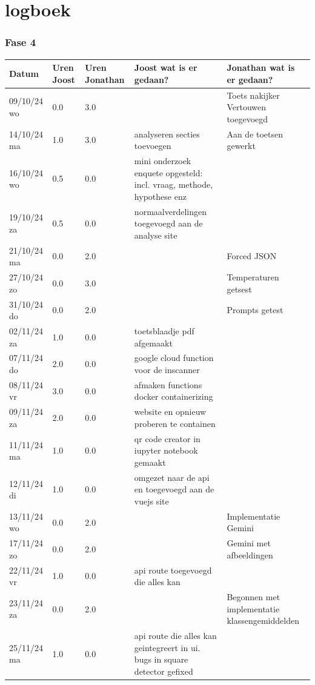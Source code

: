 \documentclass[12pt]{article}
\begin{document}
\pagebreak
\section{logboek}
\subsubsection*{Fase 4}
\footnotesize
\begin{longtable}{@{}p{2.5cm} p{1cm} p{1.5cm} p{5cm} p{5cm}}
Datum  & Uren Joost & Uren Jonathan & Joost wat is er gedaan? & Jonathan wat is er gedaan? \\
\midrule
\endhead
09/10/24 wo & 0.0 & 3.0 &  & Toets nakijker Vertouwen toegevoegd  \\
14/10/24 ma & 1.0 & 3.0 & analyseren secties toevoegen & Aan de toetsen gewerkt \\
16/10/24 wo & 0.5 & 0.0 & mini onderzoek enquete opgesteld: incl. vraag, methode, hypothese enz &  \\
19/10/24 za & 0.5 & 0.0 & normaalverdelingen toegevoegd aan de analyse site &  \\
21/10/24 ma & 0.0 & 2.0 &  & Forced JSON \\
27/10/24 zo & 0.0 & 3.0 &  & Temperaturen getsest \\
31/10/24 do & 0.0 & 2.0 &  & Prompts getest \\
02/11/24 za & 1.0 & 0.0 & toetsblaadje pdf afgemaakt &  \\
07/11/24 do & 2.0 & 0.0 & google cloud function voor de inscanner &  \\
08/11/24 vr & 3.0 & 0.0 & afmaken functions docker containerizing &  \\
09/11/24 za & 2.0 & 0.0 & website en opnieuw proberen te containen &  \\
11/11/24 ma & 1.0 & 0.0 & qr code creator in iupyter notebook gemaakt &  \\
12/11/24 di & 1.0 & 0.0 & omgezet naar de api en toegevoegd aan de vuejs site &  \\
13/11/24 wo & 0.0 & 2.0 &  & Implementatie Gemini \\
17/11/24 zo & 0.0 & 2.0 &  & Gemini met afbeeldingen \\
22/11/24 vr & 1.0 & 0.0 & api route toegevoegd die alles kan &  \\
23/11/24 za & 0.0 & 2.0 &  & Begonnen met implementatie klassengemiddelden \\
25/11/24 ma & 1.0 & 0.0 & api route die alles kan geintegreert in ui. bugs in square detector gefixed &  \\

\end{longtable}
\end{document}

